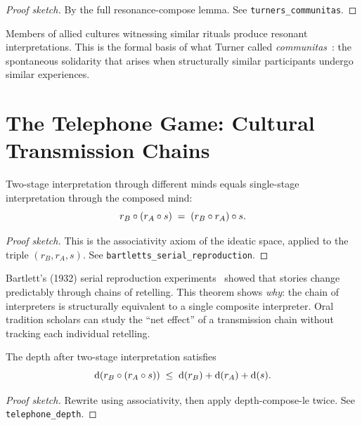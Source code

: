 \begin{proof}[Proof sketch]
By the full resonance-compose lemma.  See \texttt{turners\_communitas}.
\end{proof}

\begin{remark}
Members of allied cultures witnessing similar rituals produce resonant
interpretations.  This is the formal basis of what Turner called
\emph{communitas}~\cite{turner1969}: the spontaneous solidarity that
arises when structurally similar participants undergo similar experiences.
\end{remark}

\section{The Telephone Game: Cultural Transmission Chains}
\label{sec:ch1:telephone}

\begin{theorem}
\label{thm:bartlett}
Two-stage interpretation through different minds equals single-stage
interpretation through the composed mind:
\[
  r_B \circ (r_A \circ s)
  \;=\;
  (r_B \circ r_A) \circ s.
\]
\end{theorem}

\begin{proof}[Proof sketch]
This is the associativity axiom of the ideatic space, applied to the
triple $(r_B, r_A, s)$.
See \texttt{bartletts\_serial\_reproduction}.
\end{proof}

\begin{remark}
Bartlett's (1932) serial reproduction experiments~\cite{bartlett1932}
showed that stories change predictably through chains of retelling.  This
theorem shows \emph{why}: the chain of interpreters is structurally
equivalent to a single composite interpreter.  Oral tradition scholars
can study the ``net effect'' of a transmission chain without tracking
each individual retelling.
\end{remark}

\begin{theorem}
\label{thm:telephone-depth}
The depth after two-stage interpretation satisfies
\[
  \operatorname{d}(r_B \circ (r_A \circ s))
  \;\leq\;
  \operatorname{d}(r_B) + \operatorname{d}(r_A) + \operatorname{d}(s).
\]
\end{theorem}

\begin{proof}[Proof sketch]
Rewrite using associativity, then apply depth-compose-le twice.
See \texttt{telephone\_depth}.
\end{proof}

